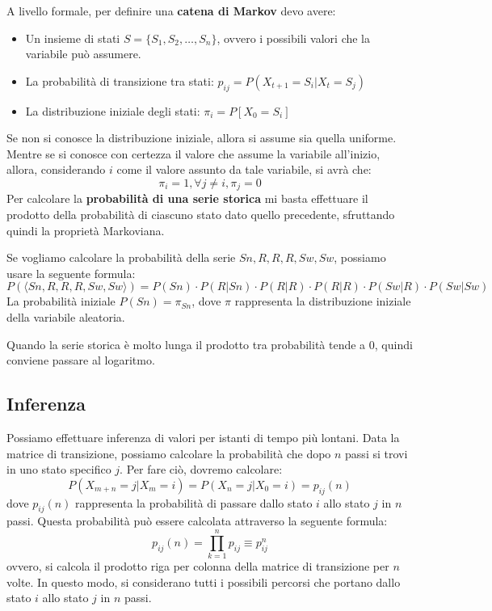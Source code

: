 A livello formale, per definire una \textbf{catena di Markov} devo avere:
\begin{itemize}
    \item Un insieme di stati $S = \{S_1, S_2, \dots, S_n\}$, ovvero i possibili
          valori che la variabile può assumere.
    \item La probabilità di transizione tra stati: $p_{ij} = P(X_{t+1} = S_i | X_t = S_j)$
    \item La distribuzione iniziale degli stati: $\pi_i = P[X_0 = S_i]$
\end{itemize}
Se non si conosce la distribuzione iniziale, allora si assume sia quella uniforme.
Mentre se si conosce con certezza il valore che assume la variabile all'inizio,
allora, considerando $i$ come il valore assunto da tale variabile, si avrà che:
\begin{equation*}
    \pi_i = 1, \forall j \neq i, \pi_j = 0
\end{equation*}
Per calcolare la \textbf{probabilità di una serie storica} mi basta effettuare
il prodotto della probabilità di ciascuno stato dato quello precedente, sfruttando
quindi la proprietà Markoviana.
\begin{esempio}
    Se vogliamo calcolare la probabilità della serie $Sn, R,R,R,Sw,Sw$, possiamo
    usare la seguente formula:
    \begin{equation*}
        P(\langle Sn, R,R,R,Sw,Sw \rangle) = P(Sn) \cdot P(R|Sn) \cdot P(R|R)
        \cdot P(R|R)\cdot P(Sw|R) \cdot P(Sw|Sw)
    \end{equation*}
    La probabilità iniziale $P(Sn) = \pi_{Sn}$, dove $\pi$ rappresenta la
    distribuzione iniziale della variabile aleatoria.
\end{esempio}
Quando la serie storica è molto lunga il prodotto tra probabilità tende a $0$,
quindi conviene passare al logaritmo.
\subsection{Inferenza}
Possiamo effettuare inferenza di valori per istanti di tempo più lontani.
Data la matrice di transizione, possiamo calcolare la probabilità che dopo $n$
passi si trovi in uno stato specifico $j$. Per fare ciò, dovremo calcolare:
\begin{equation}
    P(X_{m + n} = j | X_{m} = i) = P(X_n = j | X_0 = i)=p_{ij}(n)
\end{equation}
dove $p_{ij}(n)$ rappresenta la probabilità di passare dallo stato $i$ allo stato
$j$ in $n$ passi. Questa probabilità può essere calcolata attraverso la seguente
formula:
\begin{equation}
    p_{ij}(n) = \prod_{k = 1}^{n} p_{ij} \equiv p^n_{ij}
\end{equation}
ovvero, si calcola il prodotto riga per colonna della matrice di transizione
per $n$ volte. In questo modo, si considerano tutti i possibili percorsi che
portano dallo stato $i$ allo stato $j$ in $n$ passi.

